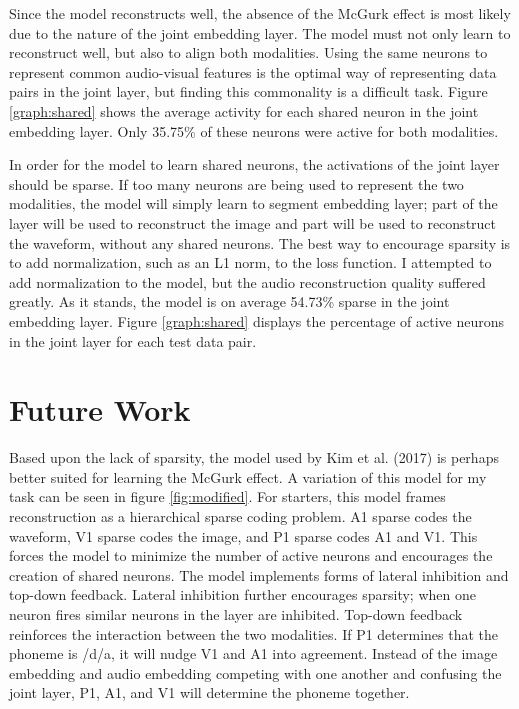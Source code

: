 \documentclass[conference]{IEEEtran}
\begin{document}
Since the model reconstructs well, the absence of the McGurk effect is most likely due to the nature of the joint embedding layer. The model must not only learn to reconstruct well, but also to align both modalities. Using the same neurons to represent common audio-visual features is the optimal way of representing data pairs in the joint layer, but finding this commonality is a difficult task. Figure \ref{graph:shared} shows the average activity for each shared neuron in the joint embedding layer. Only 35.75\% of these neurons were active for both modalities.

In order for the model to learn shared neurons, the activations of the joint layer should be sparse. If too many neurons are being used to represent the two modalities, the model will simply learn to segment embedding layer; part of the layer will be used to reconstruct the image and part will be used to reconstruct the waveform, without any shared neurons. The best way to encourage sparsity is to add normalization, such as an L1 norm, to the loss function. I attempted to add normalization to the model, but the audio reconstruction quality suffered greatly. As it stands, the model is on average 54.73\% sparse in the joint embedding layer. Figure \ref{graph:shared} displays the percentage of active neurons in the joint layer for each test data pair.

\section{Future Work}
Based upon the lack of sparsity, the model used by Kim et al. (2017) is perhaps better suited for learning the McGurk effect.\cite{Kim2017} A variation of this model for my task can be seen in figure \ref{fig:modified}. For starters, this model frames reconstruction as a hierarchical sparse coding problem. A1 sparse codes the waveform, V1 sparse codes the image, and P1 sparse codes A1 and V1. This forces the model to minimize the number of active neurons and encourages the creation of shared neurons. The model implements forms of lateral inhibition and top-down feedback. Lateral inhibition further encourages sparsity; when one neuron fires similar neurons in the layer are inhibited. Top-down feedback reinforces the interaction between the two modalities. If P1 determines that the phoneme is /d/a, it will nudge V1 and A1 into agreement. Instead of the image embedding and audio embedding competing with one another and confusing the joint layer, P1, A1, and V1 will determine the phoneme together.
\end{document}
